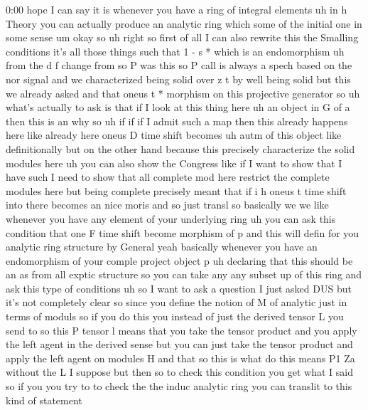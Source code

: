 \begin{unfinished}{0:00}
hope  I  can  say  it  is  whenever  you  have  a
ring  of  integral  elements  uh  in  h  Theory
you  can  actually  produce  an  analytic
ring  which  some  of  the  initial  one  in
some  sense  um  okay
so  uh  right  so  first  of  all  I  can  also
rewrite  this  the  Smalling  conditions
it's  all  those
things  such
that  1  -  s
*  which  is  an
endomorphism  uh  from  the  d  f
change  from  so  P  was  this  so  P  call  is
always  a  spech  based  on  the  nor
signal
and  we
characterized  being  solid  over  z  t  by
well  being  solid  but  this  we  already
asked  and  that  oneus  t
*  morphism  on  this  projective  generator
so  uh  what's  actually  to  ask  is  that  if
I  look  at  this  thing  here
uh  an  object  in  G  of  a  then  this  is  an
why  so  uh  if  if  if  I  admit  such  a  map
then  this  already  happens  here  like
already  here  oneus  D  time  shift
becomes  uh  autm  of  this  object  like
definitionally  but  on  the  other  hand
because  this  precisely  characterize  the
solid  modules  here  uh  you  can  also  show
the  Congress  like  if  I  want  to  show  that
I  have  such  I  need  to  show  that  all
complete  mod  here  restrict  the  complete
modules  here  but  being  complete
precisely  meant  that  if  i  h  oneus  t  time
shift  into  there  becomes  an  nice  moris
and  so  just
transl
so  basically  we  we  like  whenever  you
have  any  element  of  your  underlying  ring
uh  you  can  ask  this  condition  that  one  F
time  shift  become  morphism  of  p  and  this
will  defin  for  you  analytic  ring
structure  by
General  yeah  basically  whenever  you  have
an  endomorphism  of  your  comple  project
object  p  uh  declaring  that  this  should
be  an  as  from  all  exptic  structure  so
you  can  take  any  any  subset  up  of  this
ring  and  ask  this  type  of
conditions
uh  so  I  want  to  ask  a  question  I  just
asked  DUS  but  it's  not  completely  clear
so  since  you  define  the  notion  of  M  of
analytic  just  in  terms  of  moduls  so  if
you  do  this  you  instead  of  just  the
derived  tensor  L  you  send  to  so  this  P
tensor  l  means  that  you  take  the  tensor
product  and  you  apply  the  left  agent  in
the  derived  sense  but  you  can  just  take
the  tensor  product  and  apply  the  left
agent  on
modules  H  and  that  so  this  is  what  do
this  means  P1  Za  without  the  L  I  suppose
but  then  so  to  check  this  condition  you
get  what  I  said  so  if  you  you  try  to  to
check  the  the  induc  analytic  ring  you
can  translit  to  this  kind  of  statement

\end{unfinished}
